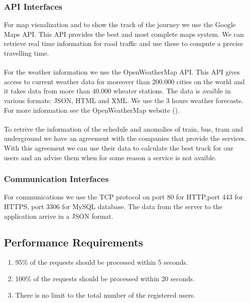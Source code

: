 \subsubsection{API Interfaces}
For map visualization and to show the track of the journey we use the Google Maps API. This API provides the best and most complete maps system. We can retrieve real time information for road traffic and use these to compute a precise travelling time.\\\\
For the weather information we use the OpenWeatherMap API. This API gives access to current weather data for moreover than 200.000 cities on the world and it takes data from more than 40.000 wheater stations. The data is avaible in various formats: JSON, HTML and XML. We use the 3 hours weather forecasts. For more information see the OpenWeatherMap website ({\href{http://openweathermap.org/api}{\color{Black}{http://openweathermap.org/api}}}).
\\\\
To retrive the information of the schedule and anomalies of train, bus, tram and underground we have an agreement with the companies that provide the services. With this agreement we can use their data to calculate the best track for our users and an advise them when for some reason a service is not avaible.

\subsubsection{Communication Interfaces}
For communications we use the TCP protocol on port 80 for HTTP,port 443 for HTTPS, port 3306 for MySQL database. The data from the server to the application arrive in a JSON format.





\subsection{Performance Requirements}
\begin{enumerate}
\item
95\% of the requests should be processed within 5 seconds.
\item
100\% of the requests should be processed within 20 seconds.
\item
There is no limit to the total number of the registered users.
\end{enumerate}

